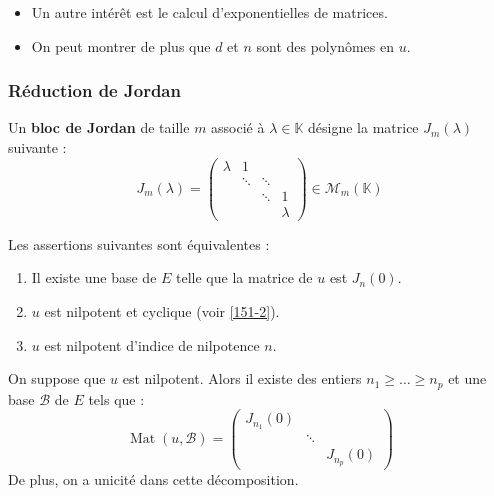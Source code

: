   \begin{remark}
    \begin{itemize}
      \item Un autre intérêt est le calcul d'exponentielles de matrices.
      \item On peut montrer de plus que $d$ et $n$ sont des polynômes en $u$.
    \end{itemize}
  \end{remark}

  \subsubsection{Réduction de Jordan}


  \begin{definition}
    Un \textbf{bloc de Jordan} de taille $m$ associé à $\lambda \in \mathbb{K}$ désigne la matrice $J_m(\lambda)$ suivante :
    \[ J_m(\lambda) = \begin{pmatrix} \lambda & 1 & \\ & \ddots & \ddots & \\ & & \ddots & 1 \\ & & & \lambda \end{pmatrix} \in \mathcal{M}_m(\mathbb{K}) \]
  \end{definition}

  \begin{proposition}
    Les assertions suivantes sont équivalentes :
    \begin{enumerate}[label=(\roman*)]
      \item Il existe une base de $E$ telle que la matrice de $u$ est $J_n(0)$.
      \item $u$ est nilpotent et cyclique (voir \cref{151-2}).
      \item $u$ est nilpotent d'indice de nilpotence $n$.
    \end{enumerate}
  \end{proposition}

  \begin{theorem}
    On suppose que $u$ est nilpotent. Alors il existe des entiers $n_1 \geq \dots \geq n_p$ et une base $\mathcal{B}$ de $E$ tels que :
    \[ \operatorname{Mat}(u, \mathcal{B}) = \begin{pmatrix} J_{n_1}(0) & & \\ & \ddots & \\ & & J_{n_p}(0) \end{pmatrix} \]
    De plus, on a unicité dans cette décomposition.
  \end{theorem}

